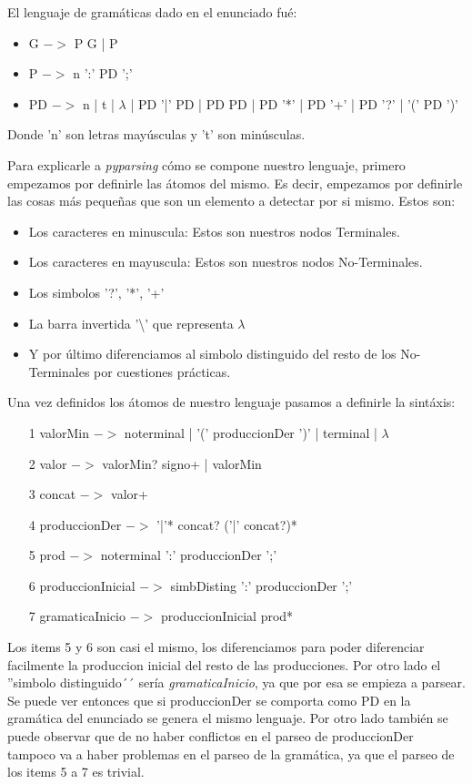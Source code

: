 \documentclass[a4paper]{report}
\begin{document}
El lenguaje de gramáticas dado en el enunciado fué:

\begin{itemize}
\item G $->$ P G | P
\item P $->$ n ':' PD ';'
\item PD $->$ n | t | $\lambda$ | PD '|' PD | PD PD | PD '*' | PD '+' | PD '?' | '(' PD ')'
\end{itemize}

Donde 'n' son letras mayúsculas y 't' son minúsculas.



Para explicarle a \emph{pyparsing} cómo se compone nuestro lenguaje, primero empezamos por definirle las átomos del mismo. Es decir, empezamos por definirle las cosas más pequeñas que son un elemento a detectar por si mismo. Estos son:
\begin{itemize}
\item Los caracteres en minuscula: Estos son nuestros nodos Terminales.
\item Los caracteres en mayuscula: Estos son nuestros nodos No-Terminales.
\item Los simbolos '?', '*', '+'
\item La barra invertida '\textbackslash' que representa $\lambda$
\item Y por último diferenciamos al simbolo distinguido del resto de los No-Terminales por cuestiones prácticas.
\end{itemize}



Una vez definidos los átomos de nuestro lenguaje pasamos a definirle la sintáxis:
\begin{itemize}
\item[1] valorMin $->$ noterminal | '(' produccionDer ')' | terminal | $\lambda$
\item[2] valor $->$ valorMin? signo+ | valorMin
\item[3] concat $->$ valor+
\item[4] produccionDer $->$ '|'* concat? ('|' concat?)*
\item[5] prod $->$ noterminal ':' produccionDer ';'
\item[6] produccionInicial $->$ simbDisting ':' produccionDer ';'
\item[7] gramaticaInicio $->$ produccionInicial prod*
\end{itemize}

Los items 5 y 6 son casi el mismo, los diferenciamos para poder diferenciar facilmente la produccion inicial del resto de las producciones. Por otro lado el ''simbolo distinguido´´ sería \emph{gramaticaInicio}, ya que por esa se empieza a parsear. Se puede ver entonces que si produccionDer se comporta como PD en la gramática del enunciado se genera el mismo lenguaje. Por otro lado también se puede observar que de no haber conflictos en el parseo de produccionDer tampoco va a haber problemas en el parseo de la gramática, ya que el parseo de los items 5 a 7 es trivial.
\end{document}
